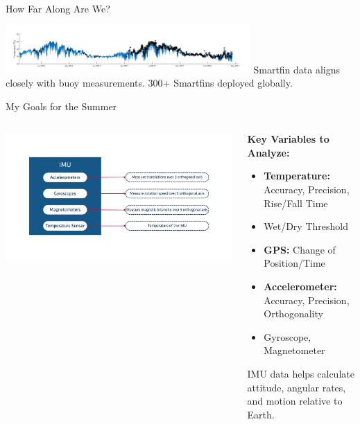 \begin{frame}{How Far Along Are We?}
    \begin{center}
        \includegraphics[width=0.7\textwidth]{images/buoy_vs_smartfin_data.jpg}
        \vspace{1em}
        \small Smartfin data aligns closely with buoy measurements. 300+ Smartfins deployed globally.
    \end{center}
\end{frame}
\begin{frame}{My Goals for the Summer}
    \begin{columns}[c]
        \begin{column}{0.45\textwidth}
            \centering
            \includegraphics[width=0.85\linewidth]{images/imu-diagram.png}
        \end{column}
        \begin{column}{0.55\textwidth}
            \small
            \textbf{Key Variables to Analyze:}
            \begin{itemize}
                \item \textbf{Temperature:} Accuracy, Precision, Rise/Fall Time
                \item Wet/Dry Threshold
                \item \textbf{GPS:} Change of Position/Time
                \item \textbf{Accelerometer:} Accuracy, Precision, Orthogonality
                \item Gyroscope, Magnetometer
            \end{itemize}
            IMU data helps calculate attitude, angular rates, and motion relative to Earth.
        \end{column}
    \end{columns}
\end{frame}
